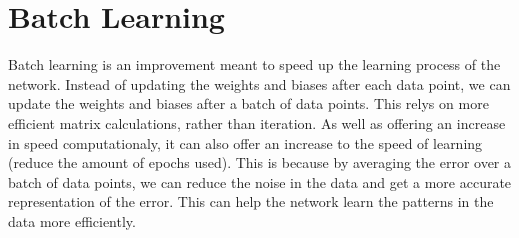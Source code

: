 \documentclass{report}
\begin{document}
\section{Batch Learning}
Batch learning is an improvement meant to speed up the learning process of the network.
Instead of updating the weights and biases after each data point, we can update the weights and biases after a batch of data points.
This relys on more efficient matrix calculations, rather than iteration.
\vspace{1em}
\newline
As well as offering an increase in speed computationaly, it can also offer an increase to the speed of learning (reduce the amount of epochs used).
This is because by averaging the error over a batch of data points, we can reduce the noise in the data and get a more accurate representation of the error.
This can help the network learn the patterns in the data more efficiently.
\end{document}
